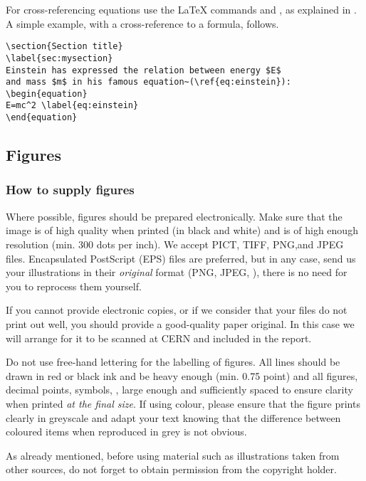 \documentclass{cernyrep}
\begin{document}
For cross-referencing equations use the \LaTeX{} commands 
and , as explained in .
A simple example, with a cross-reference to a formula, follows.

\begin{verbatim}
\section{Section title}
\label{sec:mysection}
Einstein has expressed the relation between energy $E$ 
and mass $m$ in his famous equation~(\ref{eq:einstein}):
\begin{equation}
E=mc^2 \label{eq:einstein}
\end{equation}
\end{verbatim}

\subsection{Figures}
\label{sec:figures}

\subsubsection{How to supply figures}

Where possible, figures should be prepared electronically.  Make sure
that the image is of high quality when printed (in black and white)
and is of high enough resolution (min. 300 dots per inch). We accept
PICT, TIFF, PNG,and JPEG files.  Encapsulated PostScript (EPS) files
are preferred, but in any case, send us your illustrations in their
\emph{original} format (PNG, JPEG, \etc), there is no need for you to
reprocess them yourself.

If you cannot provide electronic copies, or if we consider that your
files do not print out well, you should provide a good-quality paper
original. In this case we will arrange for it to be scanned at CERN
and included in the report.

Do not use free-hand lettering for the labelling of figures. All lines
should be drawn in red or black ink and be heavy enough (min. 0.75
point) and all figures, decimal points, symbols, \etc, large enough
and sufficiently spaced to ensure clarity when printed \emph{at the
final size}. If using colour, please ensure that the figure prints
clearly in greyscale and adapt your text knowing that the difference
between coloured items when reproduced in grey is not obvious.

As already mentioned, before using material such as illustrations
taken from other sources, do not forget to obtain permission from the
copyright holder.
\end{document}
